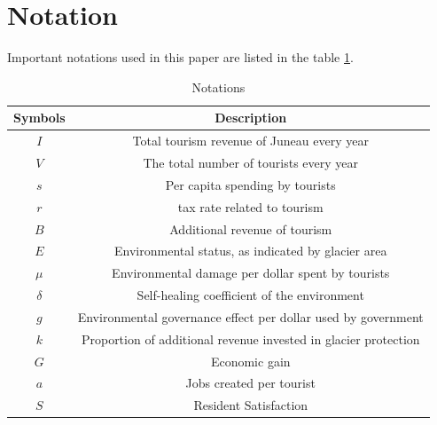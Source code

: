 \documentclass[UTF8]{mcmthesis}
\begin{document}
    \section{Notation}
        \hspace*{2em}Important notations used in this paper are listed in the table \ref{tab:notations}.
        \vspace{-.5em}
        \begin{table}[htbp]
            \centering
            \caption{Notations}
            \vspace{0.5em}
            \begin{tabular}{cc}
                \toprule                %
                    \textbf{Symbols} & \textbf{Description} \\ 
                \midrule                %
                $I$        & Total tourism revenue of Juneau every year \\ 
                $V$        & The total number of tourists every year \\ 
                $s$        & Per capita spending by tourists \\ 
                $r$        & tax rate related to tourism \\  
                $B$        & Additional revenue of tourism \\ 
                $E$        & Environmental status, as indicated by glacier area \\ 
                $\mu$      & Environmental damage per dollar spent by tourists \\ 
                $\delta$   & Self-healing coefficient of the environment  \\ 
                $g$        & Environmental governance effect per dollar used by government \\ 
                $k$        & Proportion of additional revenue invested in glacier protection \\ 
                $G$        & Economic gain \\ 
                $a$        & Jobs created per tourist \\ 
                $S$        & Resident Satisfaction \\  
                \bottomrule             %
            \end{tabular}
            \label{tab:notations}
        \end{table}
\end{document}

